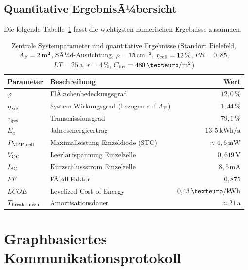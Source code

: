 ﻿\documentclass[a4paper,12pt]{article}
\theoremstyle{definition}
\theoremstyle{remark}
\newcommand{\vph}{\varphi}
\begin{document}
\subsection{Quantitative ErgebnisÃ¼bersicht}

Die folgende Tabelle~\ref{tab:ergebnisse} fasst die wichtigsten numerischen
Ergebnisse zusammen.

\begin{table}[H]
  \centering
  \renewcommand{\arraystretch}{1.3}
  \caption{Zentrale Systemparameter und quantitative Ergebnisse (Standort Bielefeld,
    $A_{\rm F} = 2\,\mathrm{m^2}$, SÃ¼d-Ausrichtung, $\rho = 15\,\mathrm{cm}^{-2}$,
    $\eta_{\rm cell} = 12\,\%$, $PR = 0{,}85$, $LT = 25\,\mathrm{a}$,
    $r = 4\,\%$, $C_{\rm inv} = 480\,\mathrm{\texteuro/m^2}$)}
  \label{tab:ergebnisse}
  \begin{tabularx}{\textwidth}{lXr}
    \toprule
    \textbf{Parameter} & \textbf{Beschreibung} & \textbf{Wert}\\
    \midrule
    $\vph$ & FlÃ¤chenbedeckungsgrad & $12{,}0\,\%$\\
    $\eta_{\rm sys}$ & System-Wirkungsgrad (bezogen auf $A_{\rm F}$) & $1{,}44\,\%$\\
    $\tau_{\rm ges}$ & Transmissionsgrad & $79{,}1\,\%$\\
    $E_a$ & Jahresenergieertrag & $13{,}5\,\mathrm{kWh/a}$\\
    $P_{\rm MPP,cell}$ & Maximalleistung Einzeldiode (STC) & $\approx 4{,}6\,\mathrm{mW}$\\
    $V_{\rm OC}$ & Leerlaufspannung Einzelzelle & $0{,}619\,\mathrm{V}$\\
    $I_{\rm SC}$ & Kurzschlussstrom Einzelzelle & $8{,}5\,\mathrm{mA}$\\
    $FF$ & FÃ¼ll-Faktor & $0{,}875$\\
    $LCOE$ & Levelized Cost of Energy & $0{,}43\,\mathrm{\texteuro/kWh}$\\
    $T_{\rm break-even}$ & Amortisationsdauer & $\approx 21\,\mathrm{a}$\\
    \bottomrule
  \end{tabularx}
\end{table}

\section{Graphbasiertes Kommunikationsprotokoll}
\label{sec:kommunikation}
\end{document}
